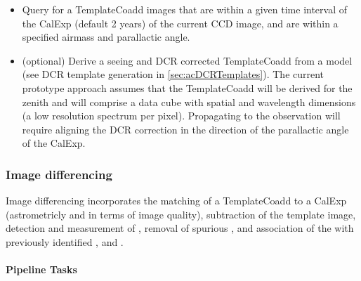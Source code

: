 \begin{itemize}
\item Query for a TemplateCoadd images that are within a given time interval of the CalExp  (default 2 years) of the current CCD image, and are within a specified airmass and parallactic angle.
\item (optional) Derive a seeing and DCR corrected TemplateCoadd from a model (see DCR template generation in \ref{sec:acDCRTemplates}). The current prototype approach assumes that the TemplateCoadd  will be derived for the zenith and will comprise a data cube with spatial and wavelength dimensions (a low resolution spectrum per pixel). Propagating to the observation will require aligning the DCR correction in the direction of the parallactic angle of the CalExp.
\end{itemize}

\subsubsection{Image differencing}

Image differencing incorporates the matching of a TemplateCoadd to a CalExp (astrometricly and in terms of image quality), subtraction of the template image, detection and measurement of \DIASources, removal of spurious \DIASources, and association of the \DIASources with previously identified \DIAObjects, and \SSObjects.

\paragraph{Pipeline Tasks}

